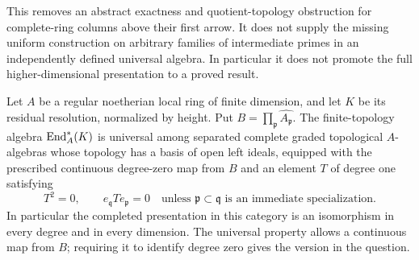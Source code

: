 This removes an abstract exactness and quotient-topology obstruction
for complete-ring columns above their first arrow. It does not
supply the missing uniform construction on arbitrary families of
intermediate primes in an independently defined universal algebra.
In particular it does not promote the full higher-dimensional
presentation to a proved result.


\begin{theorem}\label{i:linearuniversal}
Let $A$ be a regular noetherian local ring of finite dimension, and
let $K$ be its residual resolution, normalized by height. Put
$B=\prod_{\mathfrak p}\widehat{A_{\mathfrak p}}$.
The finite-topology algebra $\operatorname{End}_A^*(K)$ is universal among
separated complete graded topological $A$-algebras whose topology
has a basis of open left ideals, equipped with the prescribed
continuous degree-zero map from $B$ and an element $T$ of degree one
satisfying
\[
 T^2=0,\qquad e_{\mathfrak q}Te_{\mathfrak p}=0
 \quad\text{unless }\mathfrak p\subset\mathfrak q
 \text{ is an immediate specialization}.
\]
In particular the completed presentation in this category is an
isomorphism in every degree and in every dimension. The universal
property allows a continuous map from $B$; requiring it to identify
degree zero gives the version in the question.
\end{theorem}

